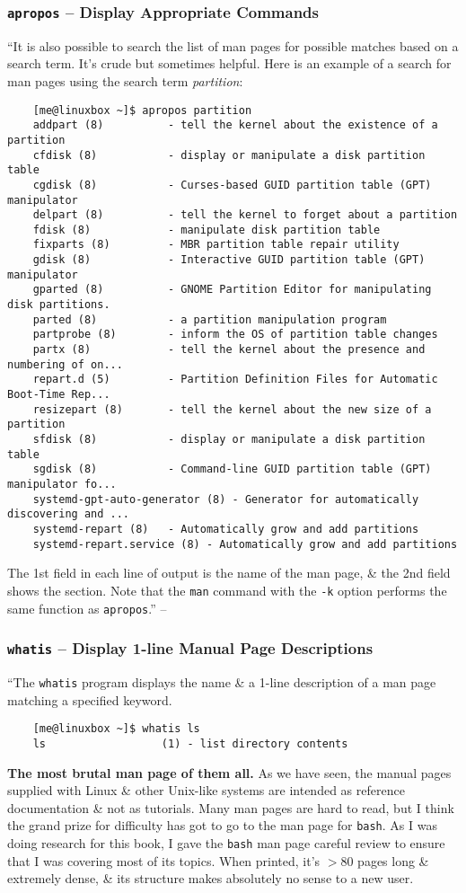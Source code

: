 \documentclass[oneside]{book}
\numberwithin{equation}{section}
\begin{document}
\subsubsection{\texttt{apropos} -- Display Appropriate Commands}
``It is also possible to search the list of man pages for possible matches based on a search term. It's crude but sometimes helpful. Here is an example of a search for man pages using the search term \textit{partition}:
\begin{verbatim}
	[me@linuxbox ~]$ apropos partition
	addpart (8)          - tell the kernel about the existence of a partition
	cfdisk (8)           - display or manipulate a disk partition table
	cgdisk (8)           - Curses-based GUID partition table (GPT) manipulator
	delpart (8)          - tell the kernel to forget about a partition
	fdisk (8)            - manipulate disk partition table
	fixparts (8)         - MBR partition table repair utility
	gdisk (8)            - Interactive GUID partition table (GPT) manipulator
	gparted (8)          - GNOME Partition Editor for manipulating disk partitions.
	parted (8)           - a partition manipulation program
	partprobe (8)        - inform the OS of partition table changes
	partx (8)            - tell the kernel about the presence and numbering of on...
	repart.d (5)         - Partition Definition Files for Automatic Boot-Time Rep...
	resizepart (8)       - tell the kernel about the new size of a partition
	sfdisk (8)           - display or manipulate a disk partition table
	sgdisk (8)           - Command-line GUID partition table (GPT) manipulator fo...
	systemd-gpt-auto-generator (8) - Generator for automatically discovering and ...
	systemd-repart (8)   - Automatically grow and add partitions
	systemd-repart.service (8) - Automatically grow and add partitions
\end{verbatim}
The 1st field in each line of output is the name of the man page, \& the 2nd field shows the section. Note that the \texttt{man} command with the \texttt{-k} option performs the same function as \texttt{apropos}.'' -- \cite[pp. 89--90]{Shotts2019}

\subsubsection{\texttt{whatis} -- Display 1-line Manual Page Descriptions}
``The \texttt{whatis} program displays the name \& a 1-line description of a man page matching a specified keyword.
\begin{verbatim}
	[me@linuxbox ~]$ whatis ls
	ls                  (1) - list directory contents
\end{verbatim}
\textbf{The most brutal man page of them all.} As we have seen, the manual pages supplied with Linux \& other Unix-like systems are intended as reference documentation \& not as tutorials. Many man pages are hard to read, but I think the grand prize for difficulty has got to go to the man page for \texttt{bash}. As I was doing research for this book, I gave the \texttt{bash} man page careful review to ensure that I was covering most of its topics. When printed, it's $> 80$ pages long \& extremely dense, \& its structure makes absolutely no sense to a new user.
\end{document}
